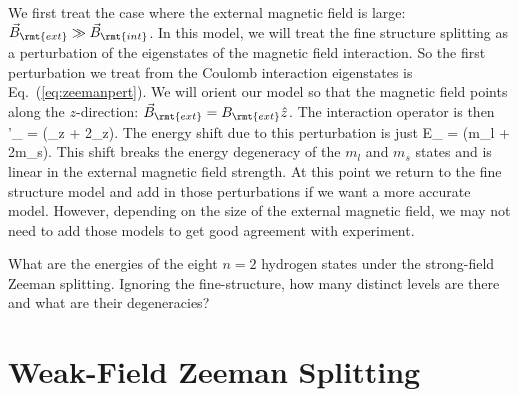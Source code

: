 We first treat the case where the external magnetic field is large: $\vec{B}_\rmt{ext} \gg \vec{B}_\rmt{int}$. In this model, we will treat the fine structure splitting as a perturbation of the eigenstates of the magnetic field interaction. So the first perturbation we treat from the Coulomb interaction eigenstates is Eq.~(\ref{eq:zeemanpert}). We will orient our model so that the magnetic field points along the $z$-direction: $\vec{B}_\rmt{ext} = B_\rmt{ext}\hat{z}$. The interaction operator is then
\beq
{}'_ = \left(_z + 2_z\right).
\eeq
The energy shift due to this perturbation is just
\beq
E_ = \left(m_l + 2m_s\right).
\eeq
This shift breaks the energy degeneracy of the $m_l$ and $m_s$ states and is linear in the external magnetic field strength. At this point we return to the fine structure model and add in those perturbations if we want a more accurate model. However, depending on the size of the external magnetic field, we may not need to add those models to get good agreement with experiment.

\begin{exercise}
What are the energies of the eight $n=2$ hydrogen states under the strong-field Zeeman splitting. Ignoring the fine-structure, how many distinct levels are there and what are their degeneracies?

\end{exercise}

\section{Weak-Field Zeeman Splitting}

